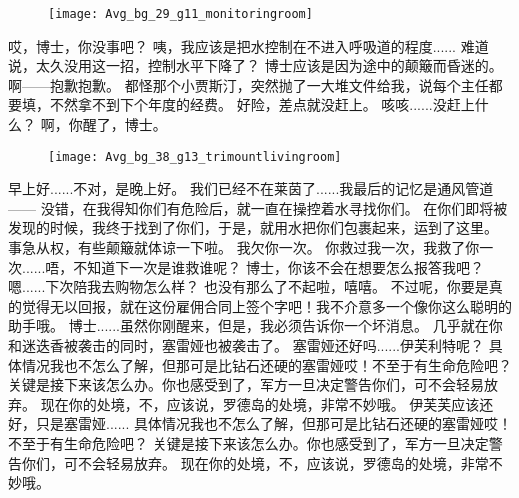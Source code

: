 \documentclass[openany]{book}
\begin{document}
\begin{figure}[h]
    \centering
    \texttt{[image: Avg\_bg\_29\_g11\_monitoringroom]}
\end{figure}
\begin{dialogue}
     哎，博士，你没事吧？
     咦，我应该是把水控制在不进入呼吸道的程度......
     难道说，太久没用这一招，控制水平下降了？
     博士应该是因为途中的颠簸而昏迷的。
     啊——抱歉抱歉。
     都怪那个小贾斯汀，突然抛了一大堆文件给我，说每个主任都要填，不然拿不到下个年度的经费。
     好险，差点就没赶上。
     咳咳......没赶上什么？
     啊，你醒了，博士。
    \begin{figure}[h]
        \centering
        \texttt{[image: Avg\_bg\_38\_g13\_trimountlivingroom]}
    \end{figure}
     早上好......不对，是晚上好。
     我们已经不在莱茵了......我最后的记忆是通风管道——
     没错，在我得知你们有危险后，就一直在操控着水寻找你们。
     在你们即将被发现的时候，我终于找到了你们，于是，就用水把你们包裹起来，运到了这里。
     事急从权，有些颠簸就体谅一下啦。
     我欠你一次。
     你救过我一次，我救了你一次......唔，不知道下一次是谁救谁呢？
     博士，你该不会在想要怎么报答我吧？
     嗯......下次陪我去购物怎么样？
     也没有那么了不起啦，嘻嘻。
     不过呢，你要是真的觉得无以回报，就在这份雇佣合同上签个字吧！我不介意多一个像你这么聪明的助手哦。
     博士......虽然你刚醒来，但是，我必须告诉你一个坏消息。
     几乎就在你和迷迭香被袭击的同时，塞雷娅也被袭击了。
     塞雷娅还好吗......伊芙利特呢？
     具体情况我也不怎么了解，但那可是比钻石还硬的塞雷娅哎！不至于有生命危险吧？
     关键是接下来该怎么办。你也感受到了，军方一旦决定警告你们，可不会轻易放弃。
     现在你的处境，不，应该说，罗德岛的处境，非常不妙哦。
     伊芙芙应该还好，只是塞雷娅......
     具体情况我也不怎么了解，但那可是比钻石还硬的塞雷娅哎！不至于有生命危险吧？
     关键是接下来该怎么办。你也感受到了，军方一旦决定警告你们，可不会轻易放弃。
     现在你的处境，不，应该说，罗德岛的处境，非常不妙哦。
\end{dialogue}
\end{document}
